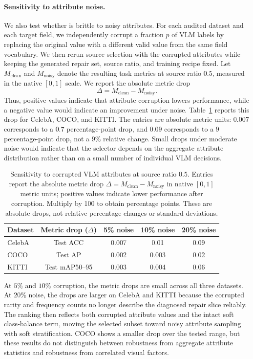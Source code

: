 \paragraph{Sensitivity to attribute noise.}
We also test whether \model is brittle to noisy attributes. For each audited dataset and each target field, we independently corrupt a fraction $p$ of VLM labels by replacing the original value with a different valid value from the same field vocabulary. We then rerun source selection with the corrupted attributes while keeping the generated repair set, source ratio, and training recipe fixed. Let $M_{\mathrm{clean}}$ and $M_{\mathrm{noisy}}$ denote the resulting task metrics at source ratio $0.5$, measured in the native $[0,1]$ scale. We report the absolute metric drop
\begin{equation}
\Delta = M_{\mathrm{clean}} - M_{\mathrm{noisy}}.
\end{equation}
Thus, positive values indicate that attribute corruption lowers performance, while a negative value would indicate an improvement under noise. Table~\ref{tab:attribute-noise-sensitivity} reports this drop for CelebA, COCO, and KITTI. The entries are absolute metric units: $0.007$ corresponds to a $0.7$ percentage-point drop, and $0.09$ corresponds to a $9$ percentage-point drop, not a $9\%$ relative change. Small drops under moderate noise would indicate that the selector depends on the aggregate attribute distribution rather than on a small number of individual VLM decisions.

\begin{table}[t]
\centering
\caption{Sensitivity to corrupted VLM attributes at source ratio $0.5$. Entries report the absolute metric drop $\Delta=M_{\mathrm{clean}}-M_{\mathrm{noisy}}$ in native $[0,1]$ metric units; positive values indicate lower performance after corruption. Multiply by 100 to obtain percentage points. These are absolute drops, not relative percentage changes or standard deviations.}
\label{tab:attribute-noise-sensitivity}
\small
\setlength{\tabcolsep}{5pt}
\begin{tabular}{l c c c c}
\toprule
\rowcolor{sectiongray} \textbf{Dataset} & \textbf{Metric drop ($\Delta$)} & \textbf{5\% noise} & \textbf{10\% noise} & \textbf{20\% noise} \\
\midrule
CelebA & Test ACC & 0.007 & 0.01 & 0.09 \\
COCO & Test AP & 0.002 & 0.003 & 0.02 \\
KITTI & Test mAP50--95 & 0.003 & 0.004 & 0.06 \\
\bottomrule
\end{tabular}
\end{table}

At $5\%$ and $10\%$ corruption, the metric drops are small across all three datasets. At $20\%$ noise, the drops are larger on CelebA and KITTI because the corrupted rarity and frequency counts no longer describe the diagnosed repair slice reliably. The ranking then reflects both corrupted attribute values and the intact soft class-balance term, moving the selected subset toward noisy attribute sampling with soft stratification. COCO shows a smaller drop over the tested range, but these results do not distinguish between robustness from aggregate attribute statistics and robustness from correlated visual factors.
